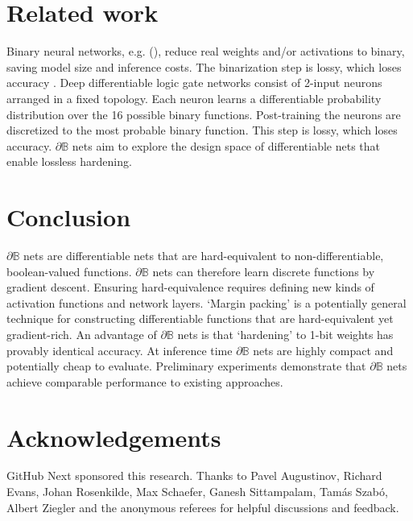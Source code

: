 \documentclass{article}
\theoremstyle{plain}
\theoremstyle{definition}
\theoremstyle{remark}
\newcommand{\citemyauthoryear}[1]{\citeauthor{#1} (\citeyear{#1})}
\begin{document}
\section{Related work}

Binary neural networks, e.g. \citemyauthoryear{10.5555/2969442.2969588}, reduce real weights and/or activations to binary, saving model size and inference costs. The binarization step is lossy, which loses accuracy \citep{QIN2020107281}. Deep differentiable logic gate networks \citep{NEURIPS2022_0d3496dd} consist of 2-input neurons arranged in a fixed topology. Each neuron learns a differentiable probability distribution over the 16 possible binary functions. Post-training the neurons are discretized to the most probable binary function. This step is lossy, which loses accuracy. $\partial\mathbb{B}$ nets aim to explore the design space of differentiable nets that enable lossless hardening.

\section{Conclusion}\label{sec:conclusion}

$\partial\mathbb{B}$ nets are differentiable nets that are hard-equivalent to non-differentiable, boolean-valued functions. $\partial\mathbb{B}$ nets can therefore learn discrete functions by gradient descent. Ensuring hard-equivalence requires defining new kinds of activation functions and network layers. `Margin packing' is a potentially general technique for constructing differentiable functions that are hard-equivalent yet gradient-rich. An advantage of $\partial\mathbb{B}$ nets is that `hardening' to 1-bit weights has provably identical accuracy. At inference time $\partial\mathbb{B}$ nets are highly compact and potentially cheap to evaluate. Preliminary experiments demonstrate that $\partial\mathbb{B}$ nets achieve comparable performance to existing approaches. 

\section*{Acknowledgements}
GitHub Next sponsored this research. Thanks to Pavel Augustinov, Richard Evans, Johan Rosenkilde, Max Schaefer, Ganesh Sittampalam, Tam\'{a}s Szab\'{o}, Albert Ziegler and the anonymous referees for helpful discussions and feedback.



\end{document}
